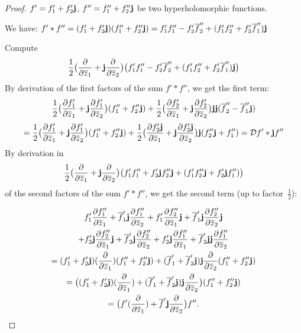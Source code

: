 \documentclass[12pt]{amsart}
\theoremstyle{definition}
\begin{document}
\begin{proof}
$f'=f'_1+f'_2{\bf j}$, $f''=f''_1+f''_2{\bf j}$ be two hyperholomorphic functions. 
\medskip

We have: $f'*f''=(f'_1+f'_2{\bf j})(f''_1+f''_2{\bf j})
= f'_1f''_1- f'_2\overline f''_2+(f'_1f''_2+f'_2\overline f''_1){\bf j}$
\smallskip

\noindent Compute
$$
\frac{1}{2}\big(\frac{\partial}{\partial\overline z_1}
+{\bf j}\frac{\partial}{\partial\overline z_2}\big) \big(f'_1f''_1- f'_2\overline f''_2+(f'_1f''_2+f'_2\overline f''_1){\bf j}\big)
$$
By derivation of the first factors of the sum $f'*f''$, we get the first term: 
$$
\frac{1}{2}\big(\frac{\partial f'_1}{\partial\overline z_1}
+{\bf j}\frac{\partial f'_1}{\partial\overline z_2}\big)(f''_1+f''_2{\bf j}) +\frac{1}{2}\big(\frac{\partial f'_2}{\partial\overline z_1}
+{\bf j}\frac{\partial f'_2}{\partial\overline z_2}\big) {\bf j}{\bf j}(\overline f''_2-\overline f''_1{\bf j}) 
$$
$$
=\frac{1}{2}\big(\frac{\partial f'_1}{\partial\overline z_1}
+{\bf j}\frac{\partial f'_1}{\partial\overline z_2}\big)(f''_1+f''_2{\bf j}) +\frac{1}{2}\big(\frac{\partial f'_2{\bf j}}{\partial\overline z_1}
+{\bf j}\frac{\partial f'_2{\bf j}}{\partial\overline z_2}\big) {\bf j}(f''_2{\bf j}+f''_1)= {\mathcal D}f'*{\bf j}f''
$$
By derivation in 
$$
\frac{1}{2}\big(\frac{\partial}{\partial\overline z_1}
+{\bf j}\frac{\partial}{\partial\overline z_2}\big) \big(f'_1f''_1+f'_2{\bf j} f''_2{\bf j}+(f'_1f''_2{\bf j}+f'_2{\bf j}f''_1)\big)
$$
of the second factors of the sum $f'*f''$, we get the second term (up to factor~$\frac{1}{2}$):

\begin{multline*}
f'_1\frac{\partial f''_1}{\partial\overline z_1}+\overline f'_1{\bf j}\frac{\partial f''_1}{\partial\overline z_2}+f'_1\frac{\partial f''_2}{\partial\overline z_1}{\bf j}+\overline f'_1{\bf j}\frac{\partial f''_2}{\partial\overline z_2}{\bf j}
\\
+f'_2{\bf j}\frac{\partial f''_2}{\partial\overline z_1}{\bf j}+\overline f'_2{\bf j}\frac{\partial f''_2}{\partial\overline z_2}+f'_2{\bf j}\frac{\partial f''_1}{\partial\overline z_1}+\overline f'_2{\bf j}{\bf j}\frac{\partial f''_1}{\partial\overline z_2}
\\
=(f'_1+f'_2{\bf j})(\frac{\partial }{\partial\overline z_1})(f''_1+ f''_2{\bf j}) +(\overline f'_1+\overline f'_2{\bf j}){\bf j}\frac{\partial }{\partial\overline z_2}(f''_1+ f''_2{\bf j})
\\
= \big((f'_1+f'_2{\bf j})(\frac{\partial }{\partial\overline z_1})+(\overline f'_1+\overline f'_2{\bf j}){\bf j}\frac{\partial }{\partial\overline z_2}\big)(f''_1+ f''_2{\bf j})
\\
= \big(f'(\frac{\partial }{\partial\overline z_1})+\overline f'{\bf j}\frac{\partial }{\partial\overline z_2}\big)f''.
\end{multline*}
\end{proof}
\end{document}
